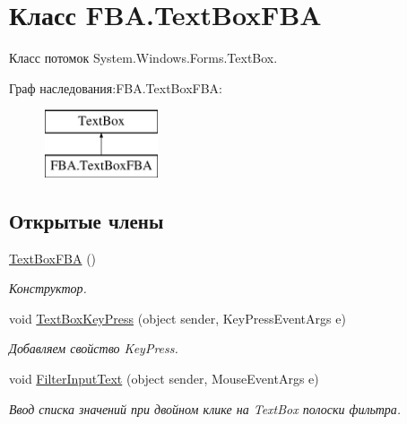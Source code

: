 \hypertarget{class_f_b_a_1_1_text_box_f_b_a}{}\section{Класс F\+B\+A.\+Text\+Box\+F\+BA}
\label{class_f_b_a_1_1_text_box_f_b_a}


Класс потомок System.\+Windows.\+Forms.\+Text\+Box. ~\newline
 


Граф наследования\+:F\+B\+A.\+Text\+Box\+F\+BA\+:\begin{figure}[H]
\begin{center}
\leavevmode
\includegraphics[height=2.000000cm]{class_f_b_a_1_1_text_box_f_b_a}
\end{center}
\end{figure}
\subsection*{Открытые члены}
\begin{DoxyCompactItemize}
\item 
\mbox{\hyperlink{class_f_b_a_1_1_text_box_f_b_a_a8f258f4d92a7187a7d0223855287a8f9}{Text\+Box\+F\+BA}} ()
\begin{DoxyCompactList}\small\item\em Конструктор. \end{DoxyCompactList}\item 
void \mbox{\hyperlink{class_f_b_a_1_1_text_box_f_b_a_a36c1f0cfdc9a2f0a2b60e467be3cf8d8}{Text\+Box\+Key\+Press}} (object sender, Key\+Press\+Event\+Args e)
\begin{DoxyCompactList}\small\item\em Добавляем свойство Key\+Press. \end{DoxyCompactList}\item 
void \mbox{\hyperlink{class_f_b_a_1_1_text_box_f_b_a_ad4715f1975aabcb6b423c555e707c952}{Filter\+Input\+Text}} (object sender, Mouse\+Event\+Args e)
\begin{DoxyCompactList}\small\item\em Ввод списка значений при двойном клике на Text\+Box полоски фильтра. \end{DoxyCompactList}\end{DoxyCompactItemize}
